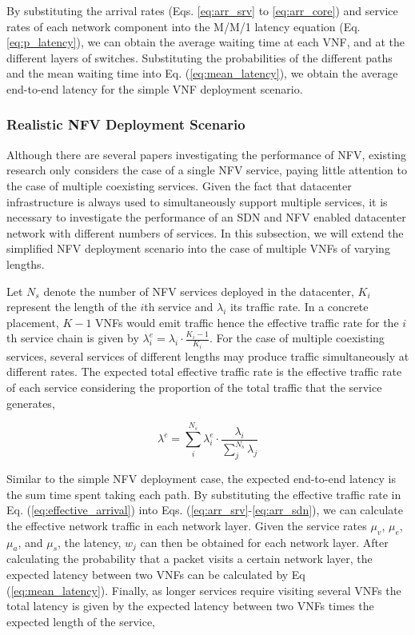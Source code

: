 By substituting the arrival rates (Eqs. \ref{eq:arr_srv} to \ref{eq:arr_core}) and service rates of each network component into the M/M/1 latency equation (Eq. \ref{eq:p_latency}), we can obtain the average waiting time at each VNF, and at the different layers of switches. Substituting the probabilities of the different paths and the mean waiting time into Eq. (\ref{eq:mean_latency}), we obtain the average end-to-end latency for the simple VNF deployment scenario.

\subsubsection{Realistic NFV Deployment Scenario}
\label{sec:realistic}

Although there are several papers investigating the performance of NFV, existing research only considers the case of a single NFV service, paying little attention to the case of multiple coexisting services. Given the fact that datacenter infrastructure is always used to simultaneously support multiple services, it is necessary to investigate the performance of an SDN and NFV enabled datacenter network with different numbers of services. In this subsection, we will extend the simplified NFV deployment scenario into the case of multiple VNFs of varying lengths.

Let $N_s$ denote the number of NFV services deployed in the datacenter, $K_i$ represent the length of the $i$th service and $\lambda_i$ its traffic rate. In a concrete placement, $K-1$ VNFs would emit traffic hence the effective traffic rate for the $i$th service chain is given by $\lambda_{i}^{e} = \lambda_{i} \cdot \frac{K_i-1}{K_i}$. For the case of multiple coexisting services, several services of different lengths may produce traffic simultaneously at different rates. The expected total effective traffic rate is the effective traffic rate of each service considering the proportion of the total traffic that the service generates,

\begin{equation}
    \label{eq:effective_arrival}
    \lambda^e = \sum_i^{N_s} \lambda_i^e \cdot \frac{\lambda_i}{\sum_j^{N_s} \lambda_j}
\end{equation}

Similar to the simple NFV deployment case, the expected end-to-end latency is the sum time spent taking each path. By substituting the effective traffic rate in Eq. (\ref{eq:effective_arrival}) into Eqs. (\ref{eq:arr_srv}-\ref{eq:arr_sdn}), we can calculate the effective network traffic in each network layer. Given the service rates $\mu_v$, $\mu_e$, $\mu_a$, and $\mu_s$, the latency, $w_j$ can then be obtained for each network layer. After calculating the probability that a packet visits a certain network layer, the expected latency between two VNFs can be calculated by Eq (\ref{eq:mean_latency}). Finally, as longer services require visiting several VNFs the total latency is given by the expected latency between two VNFs times the expected length of the service,

